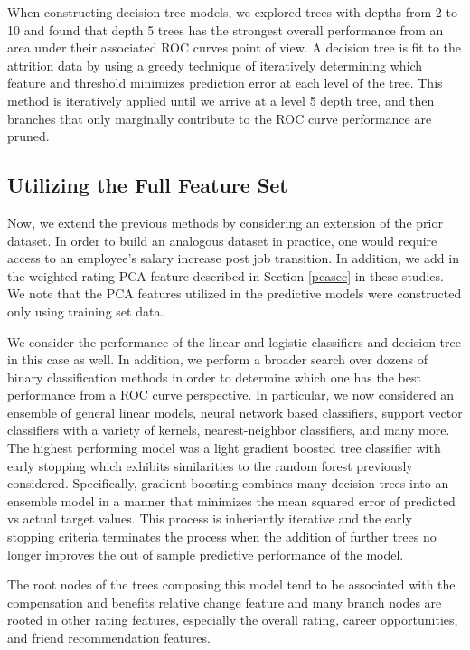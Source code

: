 \documentclass[10pt]{article}
\begin{document}
When constructing decision tree models, we explored trees with depths from 2 to 10 and 
found that depth 5 trees has the strongest overall performance from an area under their 
associated ROC curves point of view. 
A decision tree is fit to the attrition data by using a greedy technique of 
iteratively determining which feature and threshold minimizes prediction error 
at each level of the tree.  This method is iteratively applied until we arrive 
at a level 5 depth tree, and then branches that only marginally contribute to
the ROC curve performance are pruned.  

\subsection{Utilizing the Full Feature Set} 
\hspace{\parindent}
Now, we extend the previous methods by considering an extension of the 
prior dataset.  In order to build an analogous dataset in practice, one would require access to 
an employee's salary increase post job transition.
In addition, we add in the weighted rating PCA feature 
described in Section \ref{pcasec} in these studies.  We note that the 
PCA features utilized in the predictive models were constructed only using training set data.

We consider the performance of the linear and logistic classifiers and decision tree in this 
case as well. In addition, we perform a broader search over dozens of binary classification 
methods in order to determine which one has the best performance from a ROC curve perspective. 
In particular, we now considered an ensemble of general linear models, neural network based 
classifiers, support vector classifiers with a variety of kernels, nearest-neighbor classifiers, and many more.
The highest performing model was a light gradient boosted tree classifier with 
early stopping which exhibits similarities to the random forest 
previously considered.  Specifically, gradient boosting combines many decision 
trees into an ensemble model in a manner that minimizes the mean squared 
error of predicted vs actual target values.  This process is inheriently iterative 
and the early stopping criteria terminates the process when the addition of 
further trees no longer improves the out of sample predictive performance of the model.

The root nodes of the trees composing this model tend to be associated with the 
compensation and benefits relative change feature and many branch nodes 
are rooted in other rating features, especially the overall rating, 
career opportunities, and friend recommendation features.
\end{document}
